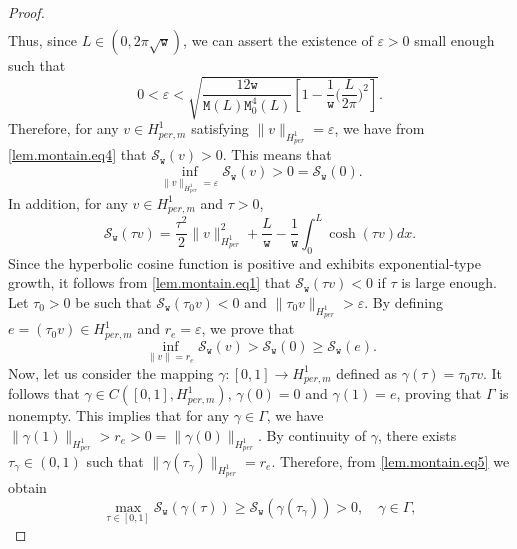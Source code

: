 \documentclass[10pt,a4paper]{amsart}
\begin{document}
\begin{proof}
\begin{equation}
\begin{array}{llllllll}
 	\end{array}\end{equation}
 	Thus, since $L\in(0,2\pi \sqrt{\mathtt{w}})$, we can assert the existence of $\varepsilon>0$ small enough such that
 	\begin{equation}
 		0<	\varepsilon<\sqrt{\frac{12\mathtt{w}}{\mathtt{M}(L)\mathtt{M}_0^4(L)}\left[1 - \frac{1}{\mathtt{w}}\biggl(\frac{L}{2\pi}\biggl)^2	 \right]}.
 	\end{equation}
 	\indent Therefore, for any $ v\in H^1_{per,m}$ satisfying $\|v\| _{H^1_{per}}=\varepsilon$, we have from \eqref{lem.montain.eq4} that $	\mathcal{S}_\mathtt{w}(v) > 0$. This means that 
 	\begin{equation}\label{lem.montain.eq5}
 		\displaystyle	\inf_{\|v\|_{H^1_{per}}=\varepsilon} \mathcal{S}_\mathtt{w}(v)>0=\mathcal{S}_\mathtt{w}(0).
 	\end{equation}
 	In addition, for any $v\in H^1_{per,m}$ and $\tau>0$, 
 	\begin{equation}\label{lem.montain.eq1}
 		\mathcal{S}_\mathtt{w} (\tau v)=\frac{\tau^2}{2} \|v\|^2_{H^1_{per}}+\frac{L}{\mathtt{w}}-\frac{1}{\mathtt{w}}\int_{0}^{L}\cosh(\tau v)dx.
 	\end{equation}
 	Since the hyperbolic cosine function is positive and exhibits exponential-type growth, it follows from \eqref{lem.montain.eq1} that $	\mathcal{S}_\mathtt{w} (\tau v)<0$ if $\tau$ is large enough. Let $\tau_0>0$ be such that  $	\mathcal{S}_\mathtt{w} (\tau_0 v)<0$ and $\|\tau_0v\|_{H^1_{per}}>\varepsilon$. By defining $e=(\tau_0 v) \in H^1_{per,m}$ and $\displaystyle r_e=\varepsilon$, we prove that	   	 	\begin{equation}\label{lem.montain.eq1'} \inf_{\|v\|=r_e}\mathcal{S}_\mathtt{w}(v)>\mathcal{S}_\mathtt{w}(0)\ge \mathcal{S}_\mathtt{w}(e). 
 	\end{equation}
 	\indent Now, let us consider the mapping
 	$\gamma:[0,1]\to H^1_{per,m}$ defined as $\gamma(\tau)=\tau_0 \tau v$. It follows that $\gamma\in C([0,1], H^1_{per,m})$, $\gamma(0)=0$ and $\gamma(1)=e$, proving that $\Gamma$ is nonempty. 	   
 	This implies that for any $\gamma\in \Gamma$, we have $\|\gamma(1)\|_{H^1_{per}} >r_e>0=\|\gamma(0)\|_{H^1_{per}}$. By continuity of $\gamma$, there exists $\tau _\gamma\in (0,1)$ such that $\|\gamma(\tau_ \gamma)\|_{H^1_{per}} =r_e$. Therefore, from \eqref{lem.montain.eq5} we obtain
 	\begin{equation}
 		\max_{\tau\in [0,1]}\mathcal{S}_\mathtt{w}(\gamma(\tau))\ge\mathcal{S}_\mathtt{w}(\gamma(\tau_\gamma))>0, \quad \gamma\in \Gamma,

\end{equation}
\end{proof}
\end{document}
